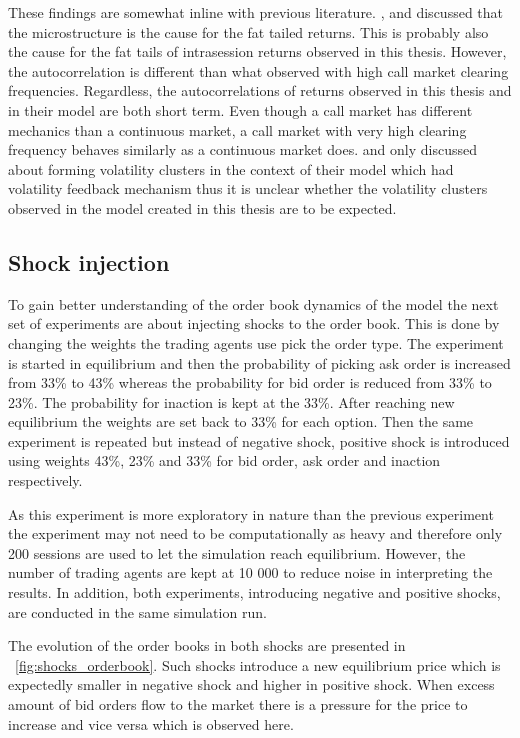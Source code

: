 These findings are somewhat inline with previous literature. \citet{Genoa01}, \citet{Raberto05} and \citet{LIU20082535} 
discussed that the microstructure is the cause for the fat tailed returns. This is probably also the cause for the
fat tails of intrasession returns observed in this thesis. However, the autocorrelation is different than what \citet{LIU20082535} 
observed with high call market clearing frequencies. Regardless, the autocorrelations of returns observed in this thesis and in their model
are both short term. Even though a call market has different mechanics than a continuous market, a call market with
very high clearing frequency behaves similarly as a continuous market does. \citet{Genoa01} and \citet{Raberto05} only discussed
about forming volatility clusters in the context of their model which had volatility feedback mechanism thus it is unclear
whether the volatility clusters observed in the model created in this thesis are to be expected.

\subsection{Shock injection}

To gain better understanding of the order book dynamics of the model the next set of experiments are about injecting shocks 
to the order book. This is done by changing the weights the trading agents use pick the order type. The experiment is started
in equilibrium and then the probability of picking ask order is increased from 33\% to 43\% whereas the probability for bid
order is reduced from 33\% to 23\%. The probability for inaction is kept at the 33\%. After reaching new equilibrium the 
weights are set back to 33\% for each option. Then the same experiment is repeated but instead of negative shock, positive 
shock is introduced using weights 43\%, 23\% and 33\% for bid order, ask order and inaction respectively. 

As this experiment is more exploratory in nature than the previous experiment the experiment may not need to be computationally
as heavy and therefore only 200 sessions are used to let the simulation reach equilibrium. However, the number of trading agents
are kept at 10 000 to reduce noise in interpreting the results. In addition, both experiments, introducing negative and 
positive shocks, are conducted in the same simulation run.

The evolution of the order books in both shocks are presented in ~\ref{fig:shocks_orderbook}. Such shocks introduce a new equilibrium
price which is expectedly smaller in negative shock and higher in positive shock. When excess amount of bid orders flow to the market
there is a pressure for the price to increase and vice versa which is observed here. 

